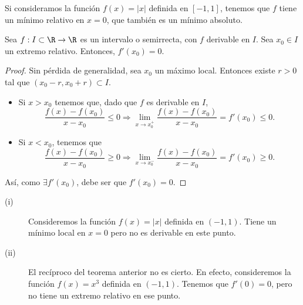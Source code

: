 \begin{eg}
	\normalfont Si consideramos la función $\displaystyle f\left(x\right) = \left|x\right| $ definida en $\displaystyle \left[-1,1\right]  $, tenemos que $\displaystyle f $ tiene un mínimo relativo en $\displaystyle x = 0 $, que también es un mínimo absoluto.
\end{eg}
\begin{ftheorem}[]
\normalfont Sea $\displaystyle f : I \subset \R \to \R  $ es un intervalo o semirrecta, con $\displaystyle f $ derivable en $\displaystyle I $. Sea $\displaystyle x_{0} \in I $ un extremo relativo. Entonces, $\displaystyle f'\left(x_{0}\right) = 0 $.
\end{ftheorem}
\begin{proof}
Sin pérdida de generalidad, sea $\displaystyle x_{0} $ un máximo local. Entonces existe $\displaystyle r > 0 $ tal que $\displaystyle \left(x_{0}-r, x_{0}+r\right) \subset I $. 
\begin{itemize}
\item Si $\displaystyle x > x_{0} $ tenemos que, dado que $\displaystyle f $ es derivable en $\displaystyle I $,
	\[ \frac{f\left(x\right)-f\left(x_{0}\right)}{x-x_{0}} \leq 0 \Rightarrow \lim_{x \to x_{0}^{+}}\frac{f\left(x\right)-f\left(x_{0}\right)}{x-x_{0}} = f'\left(x_{0}\right) \leq 0 .\]
\item Si $\displaystyle x < x_{0} $, tenemos que
	\[ \frac{f\left(x\right)-f\left(x_{0}\right)}{x-x_{0}} \geq 0 \Rightarrow \lim_{x \to x_{0}^{-}}\frac{f\left(x\right)-f\left(x_{0}\right)}{x-x_{0}} = f'\left(x_{0}\right) \geq 0 .\]
\end{itemize}
Así, como $\displaystyle \exists f'\left(x_{0}\right) $, debe ser que $\displaystyle f'\left(x_{0}\right) = 0 $.
\end{proof}
\begin{eg}
\normalfont 
\begin{description}
\item[(i)] Consideremos la función $\displaystyle f\left(x\right) = \left|x\right| $ definida en $\displaystyle \left(-1, 1\right) $. Tiene un mínimo local en $\displaystyle x= 0 $ pero no es derivable en este punto.
\item[(ii)] El recíproco del teorema anterior no es cierto. En efecto, consideremos la función $\displaystyle f\left(x\right) = x^{3} $ definida en $\displaystyle \left(-1,1\right) $. Tenemos que $\displaystyle f'\left(0\right) = 0 $, pero no tiene un extremo relativo en ese punto.
\end{description}
\end{eg}
